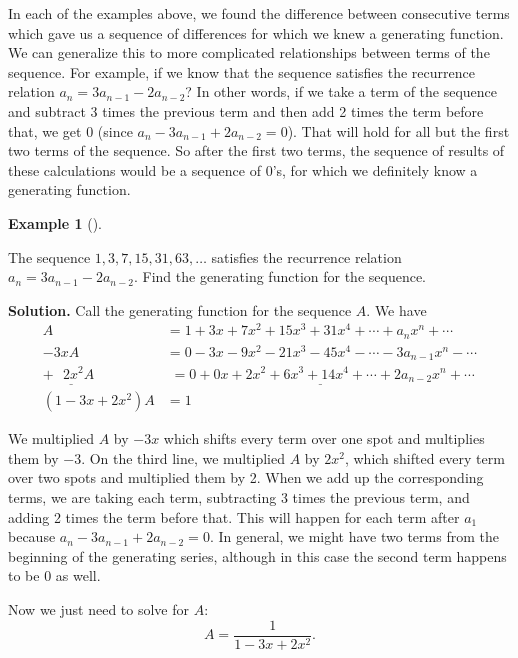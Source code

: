\documentclass[10pt,]{book}
\theoremstyle{plain}
\theoremstyle{definition}
\newtheorem{example}[theorem]{Example}
\theoremstyle{definition}
\theoremstyle{definition}
\numberwithin{equation}{chapter}
\newcommand{\amp}{ & }
\begin{document}
In each of the examples above, we found the difference between consecutive terms which gave us a sequence of differences for which we knew a generating function. We can generalize this to more complicated relationships between terms of the sequence. For example, if we know that the sequence satisfies the recurrence relation \(a_n = 3a_{n-1} - 2a_{n-2}\)? In other words, if we take a term of the sequence and subtract 3 times the previous term and then add 2 times the term before that, we get 0 (since \(a_n - 3a_{n-1} + 2a_{n-2} = 0\)). That will hold for all but the first two terms of the sequence. So after the first two terms, the sequence of results of these calculations would be a sequence of 0's, for which we definitely know a generating function.
%
\begin{example}[]\label{example-112}

The sequence \(1, 3, 7, 15, 31, 63, \ldots\) satisfies the recurrence relation \(a_n = 3a_{n-1} - 2a_{n-2}\). Find the generating function for the sequence.
%
\par\medskip\noindent%
\textbf{Solution.}\quad
Call the generating function for the sequence \(A\). We have
\begin{align*}
  A \amp  = 1 + 3x + 7x^2 + 15x^3 + 31x^4 + \cdots + a_nx^n + \cdots\\
  -3xA \amp  = 0 - 3x - 9x^2 - 21x^3 - 45x^4 - \cdots - 3a_{n-1}x^n - \cdots\\
  \underline{+~~~2x^2A_{~}^{~^{~}}} \amp  \underline{\,\, = 0 + 0x + 2x^2 + 6x^3 + 14x^4 + \cdots + 2a_{n-2}x^n + \cdots}\\
  (1-3x+2x^2)A \amp  = 1
\end{align*}
%
\par

We multiplied \(A\) by \(-3x\) which shifts every term over one spot and multiplies them by \(-3\). On the third line, we multiplied \(A\) by \(2x^2\), which shifted every term over two spots and multiplied them by 2. When we add up the corresponding terms, we are taking each term, subtracting 3 times the previous term, and adding 2 times the term before that. This will happen for each term after \(a_1\) because \(a_n - 3a_{n-1} + 2a_{n-2} = 0\). In general, we might have two terms from the beginning of the generating series, although in this case the second term happens to be 0 as well.
%
\par

Now we just need to solve for \(A\):
\begin{equation*}
  A = \frac{1}{1 - 3x + 2x^2}.
\end{equation*}
%
\end{example}
\typeout{************************************************}
\typeout{************************************************}
\end{document}
